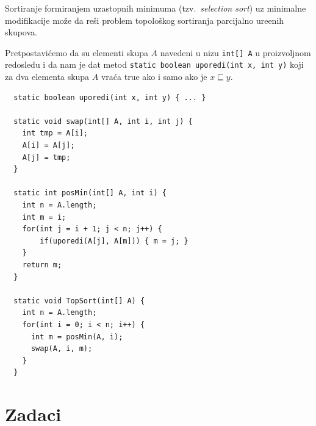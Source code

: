 \begin{EX}
  Sortiranje formiranjem uzastopnih minimuma (tzv.\ \emph{selection sort}) uz minimalne modifikacije
  mo\v ze da re\v si problem topolo\v skog sortiranja parcijalno ure\dj enih skupova.
  
  Pretpostavi\'cemo da su elementi skupa $A$ navedeni u nizu \texttt{int[] A} u proizvoljnom redosledu i
  da nam je dat metod \texttt{static boolean uporedi(int x, int y)} koji za dva elementa
  skupa $A$ vra\'ca true ako i samo ako je $x \sqsubseteq y$.

{\small
\begin{verbatim}
  static boolean uporedi(int x, int y) { ... }
  
  static void swap(int[] A, int i, int j) {
    int tmp = A[i];
    A[i] = A[j];
    A[j] = tmp;
  }

  static int posMin(int[] A, int i) {
    int n = A.length;
    int m = i;
    for(int j = i + 1; j < n; j++) {
        if(uporedi(A[j], A[m])) { m = j; }
    }
    return m;
  }

  static void TopSort(int[] A) {
    int n = A.length;
    for(int i = 0; i < n; i++) {
      int m = posMin(A, i);
      swap(A, i, m);
    }
  }
\end{verbatim}
}
\end{EX}

\clearpage

\section{Zadaci}



